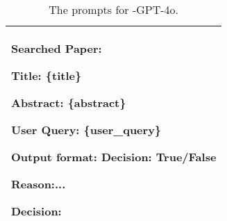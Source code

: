 \begin{table*}[h]
{\begin{tabular}{p{19cm}}
Searched Paper:

Title: \{title\}

Abstract: \{abstract\}

User Query: \{user\_query\}

Output format: Decision: True/False

Reason:... 

Decision:\\
\bottomrule[1pt]
\end{tabular}
}
\caption{The prompts for \pasa-GPT-4o.}
\label{prompt_pasa_gpt4o}
\end{table*}



